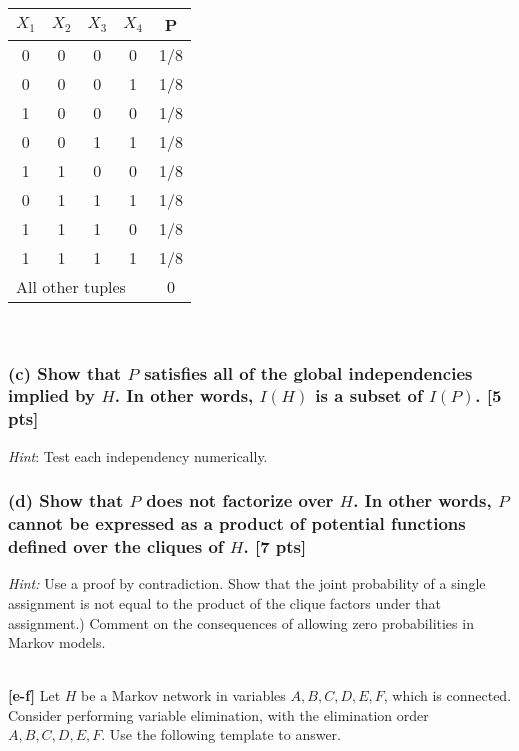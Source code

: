 \documentclass[twoside,11pt]{article}\usepackage{amsmath,amsfonts,amsthm,fullpage}
\begin{document}
\begin{table}[!h]
     \centering
    \begin{tabular}{cccc|c}
    \hline
    $X_1$ & $X_2$ & $X_3$   & $X_4$ & P   \\ \hline
    0     & 0     & 0       & 0     & 1/8 \\
    0     & 0     & 0       & 1     & 1/8 \\
    1     & 0     & 0       & 0     & 1/8 \\
    0     & 0     & 1       & 1     & 1/8 \\
    1     & 1     & 0       & 0     & 1/8 \\
    0     & 1     & 1       & 1     & 1/8 \\
    1     & 1     & 1       & 0     & 1/8 \\
    1     & 1     & 1       & 1     & 1/8 \\ \hline
    \multicolumn{4}{l|}{All other tuples}  & 0   \\ \hline
    \end{tabular}
\end{table}
\noindent

~\\
\subsubsection*{(c) Show that $P$ satisfies all of the global independencies implied by $H$. In other words, $I(H)$ is a subset of $I(P)$. [5 pts]}

\emph{Hint}: Test each independency numerically.

\subsubsection*{(d) Show that $P$ does not factorize over $H$. In other words, $P$ cannot be expressed as a product of potential functions defined over the cliques of $H$. [7 pts]}

\emph{Hint:} Use a proof by contradiction. Show that the joint
probability of a single assignment is not equal to the product of
the clique factors under that assignment.) Comment on the
consequences of allowing zero probabilities in Markov models.


~\\

\textbf{[e-f]} Let $H$ be a Markov network in variables $A, B, C, D,
E, F$, which is connected. Consider performing variable elimination,
with the elimination order $A, B, C, D, E, F$. Use the following
template to answer.
\end{document}
